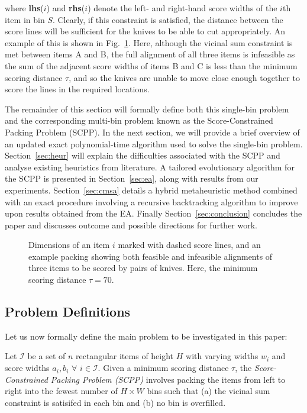 \documentclass{IEEEtran}
\begin{document}
\noindent where \textbf{lhs}($i$) and \textbf{rhs}($i$) denote the left- and right-hand score widths of the $i$th item in bin $S$. Clearly, if this constraint is satisfied, the distance between the score lines will be sufficient for the knives to be able to cut appropriately. An example of this is shown in Fig.~\ref{fig:itemsdimknives}. Here, although the vicinal sum constraint is met between items A and B, the full alignment of all three items is infeasible as the sum of the adjacent score widths of items B and C is less than the minimum scoring distance $\tau$, and so the knives are unable to move close enough together to score the lines in the required locations.

The remainder of this section will formally define both this single-bin problem and the corresponding multi-bin problem known as the Score-Constrained Packing Problem (SCPP). In the next section, we will provide a brief overview of an updated exact polynomial-time algorithm used to solve the single-bin problem. Section~\ref{sec:heur} will explain the difficulties associated with the SCPP and analyse existing heuristics from literature. A tailored evolutionary algorithm for the SCPP is presented in Section~\ref{sec:ea}, along with results from our experiments. Section~\ref{sec:cmsa} details a hybrid metaheuristic method combined with an exact procedure involving a recursive backtracking algorithm to improve upon results obtained from the EA. Finally Section~\ref{sec:conclusion} concludes the paper and discusses outcome and possible directions for further work.

\begin{figure}[H]	
	\centering
	
	\caption{Dimensions of an item $i$ marked with dashed score lines, and an example packing showing both feasible and infeasible alignments of three items to be scored by pairs of knives. Here, the minimum scoring distance $\tau = 70$.}	
	\label{fig:itemsdimknives}
\end{figure}

\subsection{Problem Definitions}
\label{sub:intro}
Let us now formally define the main problem to be investigated in this paper:

\begin{definition}
	Let $\mathcal{I}$ be a set of $n$ rectangular items of height $H$ with varying widths $w_i$ and score widths $a_i, b_i$ $\forall$ $i \in \mathcal{I}$. Given a minimum scoring distance $\tau$, the \emph{Score-Constrained Packing Problem (SCPP)} involves packing the items from left to right into the fewest number of $H \times W$ bins such that (a) the vicinal sum constraint is satisifed in each bin and (b) no bin is overfilled.
	\label{defn:scpp}
\end{definition}	
\end{document}
